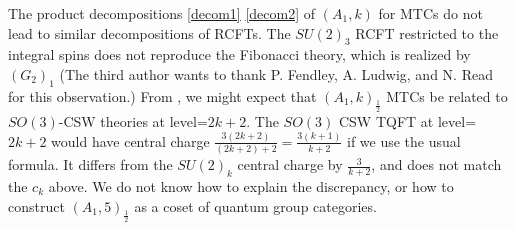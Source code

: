 \documentclass[12pt,psamsfonts]{amsart}
\numberwithin{equation}{section}
\theoremstyle{definition}
\begin{document}
The product decompositions \ref{decom1} \ref{decom2} of $(A_1,k)$
for MTCs do not lead to similar decompositions of RCFTs. The
$SU(2)_3$ RCFT restricted to the integral spins does not reproduce
the Fibonacci theory, which is realized by $(G_2)_1$ (The third
author wants to thank P. Fendley, A. Ludwig, and N. Read for this
observation.)  From \cite{MS3}\cite{DW}, we might expect that
$(A_1,k)_{\frac{1}{2}}$ MTCs be related to $SO(3)$-CSW theories at
level=$2k+2$. The $SO(3)$ CSW TQFT at level=$2k+2$ would have
central charge $\frac{3(2k+2)}{(2k+2)+2}=\frac{3(k+1)}{k+2}$ if we
use the usual formula. It differs from the $SU(2)_k$ central
charge by $\frac{3}{k+2}$, and does not match the $c_k$ above. We
do not know how to explain the discrepancy, or how to construct
$(A_1,5)_{\frac{1}{2}}$ as a coset of quantum group categories.

\fi
\end{document}
